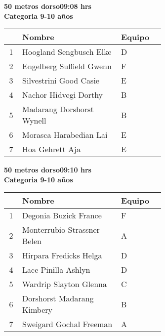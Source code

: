 \begin{minipage}{0.95\linewidth}\vspace{0.5cm} 
\begin{flushleft}
\textbf{
\hspace{-0.15cm}50 metros dorso\hspace{1.5cm}09:08 hrs \\Categoria 9-10 años}\vspace{-0.2cm} 
\end{flushleft}
\begin{tabular}{cp{0.63\linewidth}l}
\hline
& \textbf{Nombre} & \textbf{Equipo} \\ \hline
1 & Hoogland Sengbusch Elke & D \\ 
2 & Engelberg Suffield Gwenn & F \\ 
3 & Silvestrini Good Casie & E \\ 
4 & Nachor Hidvegi Dorthy & B \\ 
5 & Madarang Dorshorst Wynell & B \\ 
6 & Morasca Harabedian Lai & E \\ 
7 & Hoa Gehrett Aja & E \\ 
\end{tabular}
\end{minipage}
\begin{minipage}{0.95\linewidth}\vspace{0.5cm} 
\begin{flushleft}
\textbf{
\hspace{-0.15cm}50 metros dorso\hspace{1.5cm}09:10 hrs \\Categoria 9-10 años}\vspace{-0.2cm} 
\end{flushleft}
\begin{tabular}{cp{0.63\linewidth}l}
\hline
& \textbf{Nombre} & \textbf{Equipo} \\ \hline
1 & Degonia Buzick France & F \\ 
2 & Monterrubio Strassner Belen & A \\ 
3 & Hirpara Fredicks Helga & D \\ 
4 & Lace Pinilla Ashlyn & D \\ 
5 & Wardrip Slayton Glenna & C \\ 
6 & Dorshorst Madarang Kimbery & B \\ 
7 & Sweigard Gochal Freeman & A \\ 
\end{tabular}
\end{minipage}
